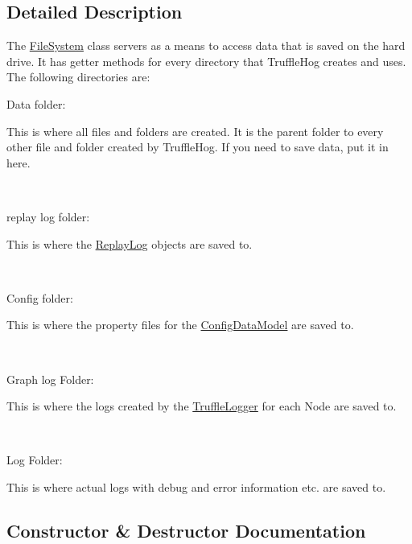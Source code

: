 \subsection{Detailed Description}
The \hyperlink{classedu_1_1kit_1_1trufflehog_1_1model_1_1_file_system}{File\+System} class servers as a means to access data that is saved on the hard drive. It has getter methods for every directory that Truffle\+Hog creates and uses. The following directories are\+: 
\begin{DoxyItemize}
\item Data folder\+: 

This is where all files and folders are created. It is the parent folder to every other file and folder created by Truffle\+Hog. If you need to save data, put it in here. 

~\newline
 
\item replay log folder\+: 

This is where the \hyperlink{}{Replay\+Log} objects are saved to. 

~\newline
 
\item Config folder\+: 

This is where the property files for the \hyperlink{}{Config\+Data\+Model} are saved to. 

~\newline
 
\item Graph log Folder\+: 

This is where the logs created by the \hyperlink{}{Truffle\+Logger} for each Node are saved to. 

~\newline
 
\item Log Folder\+: 

This is where actual logs with debug and error information etc. are saved to. 


\end{DoxyItemize}

\subsection{Constructor \& Destructor Documentation}
\hypertarget{classedu_1_1kit_1_1trufflehog_1_1model_1_1_file_system_adbc995de33c1ac9171e424abaa8d69d8}{}
